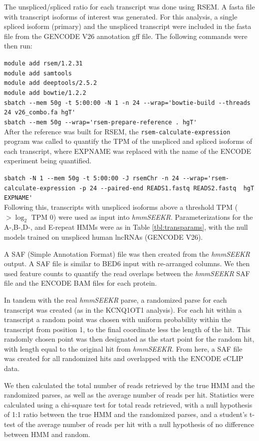 The unspliced/spliced ratio for each transcript was done using RSEM. A fasta file with transcript isoforms of interest was generated. For this analysis, a single spliced isoform (primary) and the unspliced transcript were included in the fasta file from the GENCODE V26 annotation gff file. The following commands were then run: 

\lstinline{module add rsem/1.2.31}\\
\lstinline{module add samtools}\\
\lstinline{module add deeptools/2.5.2}\\
\lstinline{module add bowtie/1.2.2}\\
\lstinline{sbatch --mem 50g -t 5:00:00 -N 1 -n 24 --wrap='bowtie-build --threads 24 v26_combo.fa hgT'}\\
\lstinline{sbatch --mem 50g --wrap='rsem-prepare-reference . hgT'}\\    


After the reference was built for RSEM, the \texttt{rsem-calculate-expression} program was called to quantify the TPM of the unspliced and spliced isoforms of each transcript, where EXPNAME was replaced with the name of the ENCODE experiment being quantified. 

\lstinline{sbatch -N 1 --mem 50g -t 5:00:00 -J rsemChr -n 24 --wrap='rsem-calculate-expression -p 24 --paired-end READS1.fastq READS2.fastq  hgT EXPNAME'}\\

Following this, transcripts with unspliced isoforms above a threshold TPM ($> \log_2$ TPM 0) were used as input into \emph{hmmSEEKR}. Parameterizations for the A-,B-,D-, and E-repeat HMMs were as in Table \ref{tbl:transparams}, with the null models trained on unspliced human lncRNAs (GENCODE V26).  

A SAF (Simple Annotation Format) file was then created from the \emph{hmmSEEKR} output. A SAF file is similar to BED6 input with re-arranged columns. We then used feature counts to quantify the read overlaps between the \emph{hmmSEEKR} SAF file and the ENCODE BAM files for each protein. 

In tandem with the real \emph{hmmSEEKR} parse, a randomized parse for each transcript was created (as in the KCNQ1OT1 analysis). For each hit within a transcript a random point was chosen with uniform probability within the transcript from position 1, to the final coordinate less the length of the hit. This randomly chosen point was then designated as the start point for the random hit, with length equal to the original hit from \emph{hmmSEEKR}. From here, a SAF file was created for all randomized hits and overlapped with the ENCODE eCLIP data. 

We then calculated the total number of reads retrieved by the true HMM and the randomized parses, as well as the average number of reads per hit. Statistics were calculated using a chi-square test for total reads retrieved, with a null hypothesis of 1:1 ratio between the true HMM and the randomized parses, and a student's t-test of the average number of reads per hit with a null hypothesis of no difference between HMM and random. 
\begin{singlespace}
\printbibliography[heading=bibintoc,title={References}]
\end{singlespace}